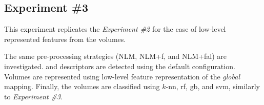 \subsection{Experiment \#3}\label{subsec:exp3}
%
%
%
%

This experiment replicates the \emph{Experiment \#2} for the case of low-level represented features from the volumes.

The same pre-processing strategies (NLM, NLM+\acs{f}, and NLM+\acs{fal}) are investigated.
\lbp and \lbptop descriptors are detected using the default configuration.
Volumes are represented using low-level feature representation of the \emph{global} mapping.
Finally, the volumes are classified using $k$-\ac{nn}, \ac{rf}, \ac{gb}, and \ac{svm}, similarly to \emph{Experiment \#3}.



